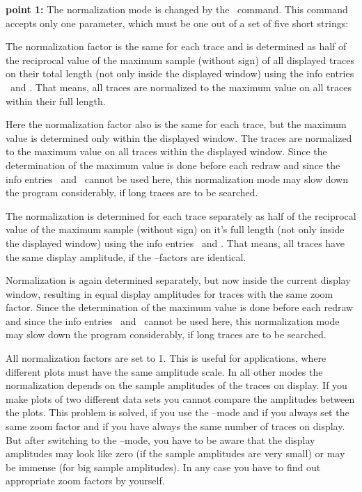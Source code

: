\noindent
{\bf point 1:}
The normalization mode is changed by the \ command.  This
command accepts only one parameter, which must be one out of a set
of five short strings:
\begin{deflist}{}
\item[\exm{af}]
   The normalization factor is the same for each trace and is
   determined as half of the reciprocal value of the maximum
   sample (without sign) of all displayed traces on their total
   length (not only inside the displayed window) using the info
   entries \ and .  That means,
   all traces are normalized to the maximum value on all traces
   within their full length.
\item[\exm{aw}]
   Here the normalization factor also is the same for each trace,
   but the maximum value is determined only within the displayed
   window.  The traces are normalized to the maximum value on all
   traces within the displayed window.  Since the determination
   of the maximum value is done before each redraw and since the
   info entries \ and \ cannot be used
   here, this normalization mode may slow down the program
   considerably, if long traces are to be searched.
\item[\exm{sf}]
   The normalization is determined for each trace separately as
   half of the reciprocal value of the maximum sample (without sign)
   on it's full length (not only inside the displayed window)
   using the info entries \ and .
   That means, all traces have the same display amplitude, if the
   --factors are identical.
\item[\exm{sw}]
   Normalization is again determined separately, but now inside
   the current display window, resulting in equal display amplitudes
   for traces with the same zoom factor.  Since the determination
   of the maximum value is done before each redraw and since the
   info entries \ and \ cannot be used
   here, this normalization mode may slow down the program
   considerably, if long traces are to be searched.
\item[\exm{c}]
   All normalization factors are set to 1.  This is useful for
   applications, where different plots must have the same
   amplitude scale.  In all other modes the normalization depends
   on the sample amplitudes of the traces on display.  If you make
   plots of two different data sets you cannot compare the amplitudes
   between the plots.  This problem is solved, if you use the
   --mode and if you always set the same zoom factor and
   if you have always the same number of traces on display.  But
   after switching to the --mode, you have to be aware that
   the display amplitudes may look like zero (if the sample amplitudes
   are very small) or may be immense (for big sample amplitudes).
   In any case you have to find out appropriate zoom factors by
   yourself.
\end{deflist}

